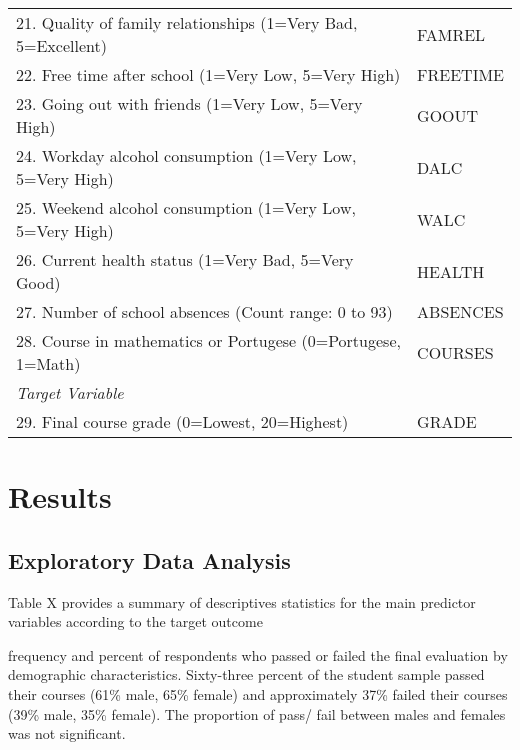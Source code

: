 \documentclass[sigconf]{acmart}
\begin{document}
\begin{table*}[ht]
\begin{tabular}{ll}
    21. Quality of family relationships (1=Very Bad, 5=Excellent) & FAMREL  \\
    22. Free time after school (1=Very Low, 5=Very High) & FREETIME  \\
    23. Going out with friends (1=Very Low, 5=Very High) & GOOUT  \\
    24. Workday alcohol consumption (1=Very Low, 5=Very High) & DALC  \\
    25. Weekend alcohol consumption (1=Very Low, 5=Very High) & WALC  \\
    26. Current health status (1=Very Bad, 5=Very Good) & HEALTH  \\ 
    27. Number of school absences (Count range: 0 to 93) & ABSENCES  \\
    28. Course in mathematics or Portugese (0=Portugese, 1=Math) & COURSES  \\
    \midrule
    \textit{Target Variable} &  \\
    \midrule
    29. Final course grade (0=Lowest, 20=Highest) & GRADE \\
    \bottomrule
  \end{tabular}
\end{table*}






 
\section{Results}

\subsection{Exploratory Data Analysis}

Table X provides a summary of descriptives statistics for the main
predictor variables according to the target outcome 

frequency and percent of respondents who passed or
failed the final evaluation by demographic characteristics. Sixty-three percent 
of the student sample passed their courses (61\% male, 65\% female) and 
approximately 37\% failed their courses (39\% male, 35\% female). The 
proportion of pass/ fail between males and females was not significant. 
\end{document}
